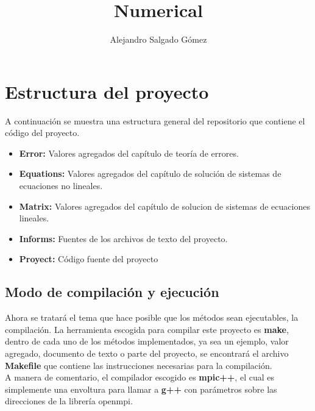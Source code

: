 \documentclass{article}
\begin{document}
\title{Numerical}
\author{Alejandro Salgado Gómez}

\maketitle

\section{Estructura del proyecto}

A continuación se muestra una estructura general del repositorio que
contiene el código del proyecto.

\begin{itemize}
    \item \textbf{Error:} Valores agregados del capítulo de teoría
        de errores.

    \item \textbf{Equations:} Valores agregados del capítulo de
        solución de sistemas de ecuaciones no lineales.


    \item \textbf{Matrix:} Valores agregados del capítulo de solucion
        de sistemas de ecuaciones lineales.

    \item \textbf{Informs:} Fuentes de los archivos de texto del
        proyecto.

    \item \textbf{Proyect:} Código fuente del proyecto

\end{itemize}

\subsection{Modo de compilación y ejecución}

Ahora se tratará el tema que hace posible que los métodos sean
ejecutables, la compilación. La herramienta escogida para compilar
este proyecto es \textbf{make}, dentro de cada uno de los métodos
implementados, ya sea un ejemplo, valor agregado, documento de
texto o parte del proyecto, se encontrará el archivo
\textbf{Makefile} que contiene las instrucciones necesarias para la
compilación.\\

A manera de comentario, el compilador escogido es \textbf{mpic++},
el cual es simplemente una envoltura para llamar a \textbf{g++} con
parámetros sobre las direcciones de la librería openmpi.\\
\end{document}

